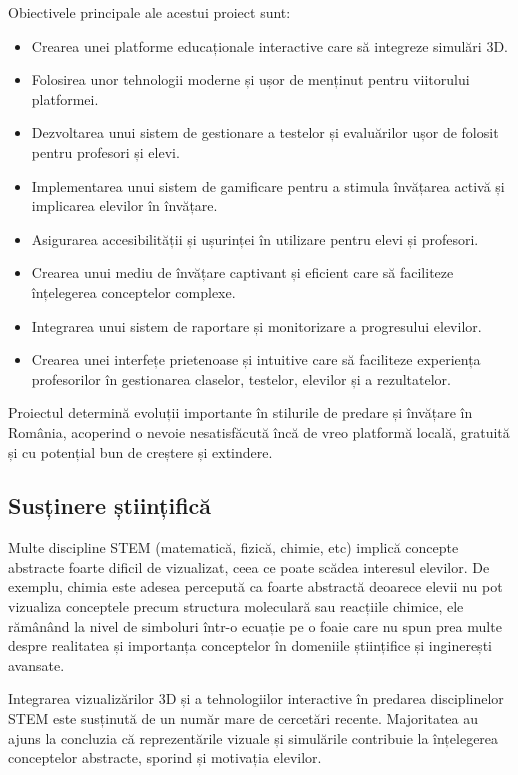 Obiectivele principale ale acestui proiect sunt:
\begin{itemize}
    \item Crearea unei platforme educaționale interactive care să integreze simulări 3D.
    \item Folosirea unor tehnologii moderne și ușor de menținut pentru viitorului platformei.
    \item Dezvoltarea unui sistem de gestionare a testelor și evaluărilor ușor de folosit pentru profesori și elevi.
    \item Implementarea unui sistem de gamificare pentru a stimula învățarea activă și implicarea elevilor în învățare.
    \item Asigurarea accesibilității și ușurinței în utilizare pentru elevi și profesori.
    \item Crearea unui mediu de învățare captivant și eficient care să faciliteze înțelegerea conceptelor complexe.
    \item Integrarea unui sistem de raportare și monitorizare a progresului elevilor.
    \item Crearea unei interfețe prietenoase și intuitive care să faciliteze experiența profesorilor în gestionarea
    claselor, testelor, elevilor și a rezultatelor.
\end{itemize}

Proiectul determină evoluții importante în stilurile de predare și învățare în România, acoperind o nevoie
nesatisfăcută încă de vreo platformă locală, gratuită și cu potențial bun de creștere și extindere.

\subsection{Susținere științifică}
\label{sub-sec:proj-scientific-support}

Multe discipline STEM (matematică, fizică, chimie, etc) implică concepte abstracte foarte dificil de vizualizat, ceea ce
poate scădea interesul elevilor. De exemplu, chimia este adesea percepută ca foarte abstractă deoarece elevii nu pot
vizualiza conceptele precum structura moleculară sau reacțiile chimice, ele rămânând la nivel de simboluri 
într-o ecuație pe o foaie care nu spun prea multe despre realitatea și importanța conceptelor în domeniile
științifice și inginerești avansate. 

Integrarea vizualizărilor 3D și a tehnologiilor interactive în predarea disciplinelor STEM este susținută de un
număr mare de cercetări recente. Majoritatea au ajuns la concluzia că reprezentările vizuale și simulările contribuie
la înțelegerea conceptelor abstracte, sporind și motivația elevilor.

